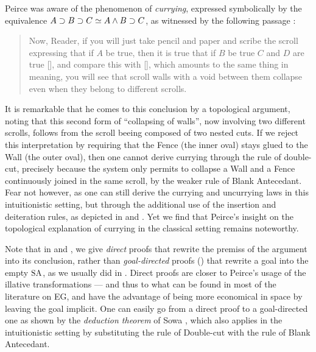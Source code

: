 Peirce was aware of the phenomenon of \emph{currying}, expressed symbolically by
the equivalence $A \supset B \supset C \simeq A \land B \supset C$, as witnessed by
the following passage \cite[p.~535]{peirce_prolegomena_1906}:
\begin{quote}
Now, Reader, if you will just take pencil and paper and scribe the scroll
expressing that if $A$ be true, then it is true that if $B$ be true $C$ and $D$
are true [], and compare this with [],
which amounts to the same thing in meaning, you will see that scroll walls with
a void between them collapse even when they belong to different scrolls.
\end{quote}
It is remarkable that he comes to this conclusion by a topological argument,
noting that this second form of ``collapsing of walls'', now involving two
different scrolls, follows from the scroll beeing composed of two nested cuts.
If we reject this interpretation by requiring that the Fence (the inner oval)
stays glued to the Wall (the outer oval), then one cannot derive currying
through the rule of double-cut, precisely because the system only permits to
collapse a Wall and a Fence continuously joined in the same scroll, by the
weaker rule of Blank Antecedant. Fear not however, as one can still derive the
currying and uncurrying laws in this intuitionistic setting, but through the
additional use of the insertion and deiteration rules, as depicted in
 and . Yet we find that Peirce's insight
on the topological explanation of currying in the classical setting remains
noteworthy.

\begin{remark}
Note that in  and , we give
\emph{direct} proofs that rewrite the premiss of the argument into its
conclusion, rather than \emph{goal-directed} proofs () that
rewrite a goal into the empty $\small\textsc{SA}$, as we usually did in . Direct
proofs are closer to Peirce's usage of the illative transformations --- and thus
to what can be found in most of the literature on EG, and have the advantage of
being more economical in space by leaving the goal implicit. One can easily go
from a direct proof to a goal-directed one as shown by the \emph{deduction
theorem} of Sowa \cite[Section 6]{sowa_peirces_2011}, which also applies
in the intuitionistic setting by substituting the rule of Double-cut with the
rule of Blank Antecedant.
\end{remark}

